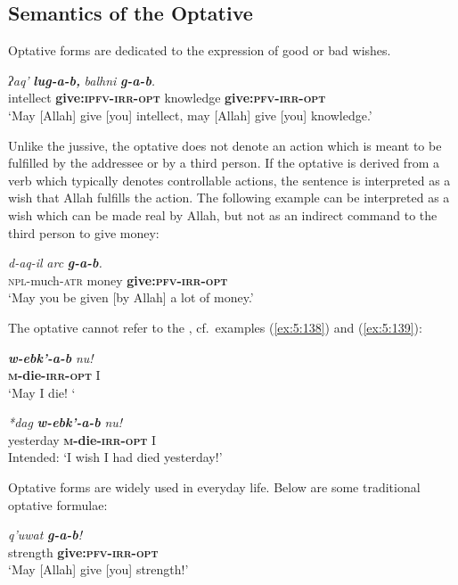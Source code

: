 ﻿\documentclass[output=paper]{langsci/langscibook}
\begin{document}
\subsection{Semantics of the Optative}\label{semantics-of-the-optative}

Optative forms are dedicated to the expression of good or bad wishes.

\ea %
\gll \emph{ʔaq'} \emph{\textbf{lug-a-b,}} \emph{balhni} \emph{\textbf{g-a-b}.}\\
 intellect \textbf{give:\textsc{ipfv}-\textsc{irr}-\textsc{opt}} knowledge \textbf{give:\textsc{pfv}-\textsc{irr}-\textsc{opt}}\\
\glt `May [Allah] give [you] intellect, may [Allah] give [you] knowledge.'
\z

Unlike the jussive, the optative does not denote an action which is
meant to be fulfilled by the addressee or by a third person. If the
optative is derived from a verb which typically denotes controllable
actions, the sentence is interpreted as a wish that Allah fulfills the
action. The following example can be interpreted as a wish which can be
made real by Allah, but not as an indirect command to the third person to
give money:

\ea %
\gll \emph{d-aq-il} \emph{arc} \emph{\textbf{g-a-b}.}\\
 \textsc{npl}-much-\textsc{atr} money \textbf{give:\textsc{pfv}-\textsc{irr}-\textsc{opt}}\\
\glt `May you be given [by Allah] a lot of money.'
\z

The optative cannot refer to the , cf.\ examples (\ref{ex:5:138}) and (\ref{ex:5:139}):

\ea \label{ex:5:138} %
\gll \emph{\textbf{w-ebk'-a-b}} \emph{nu!}\\
\textbf{\textsc{m}-die-\textsc{irr}-\textsc{opt}} I\\
\glt `May I die! `

\ex \label{ex:5:139} %
\gll \emph{*dag} \emph{\textbf{w-ebk'-a-b}} \emph{nu!}\\
 yesterday \textbf{\textsc{m}-die-\textsc{irr}-\textsc{opt}} I\\
\glt Intended: `I wish I had died yesterday!'
\z

Optative forms are widely used in everyday life. Below are some
traditional optative formulae:

\ea %
\gll \emph{q'uwat} \emph{\textbf{g-a-b}!}\\
 strength \textbf{give:\textsc{pfv}-\textsc{irr}-\textsc{opt}}\\
\glt `May [Allah] give [you] strength!'
\end{document}
